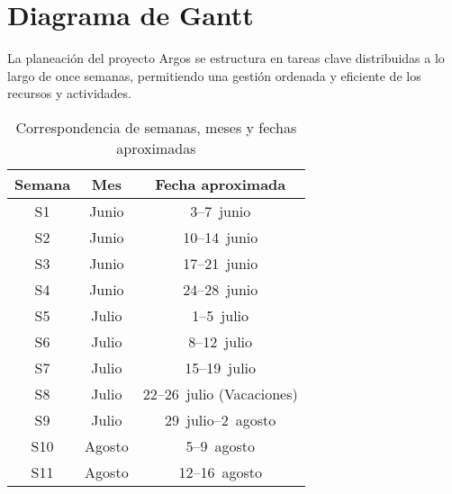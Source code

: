 \section{Diagrama de Gantt}

La planeación del proyecto Argos se estructura en tareas clave distribuidas a lo largo de once semanas, permitiendo una gestión ordenada y eficiente de los recursos y actividades.

\begin{table}[htbp]
  \centering
  \caption{Correspondencia de semanas, meses y fechas aproximadas}
  \begin{tabular}{ccc}
    \toprule
    \rowcolor{gray!30}
    \textbf{Semana} & \textbf{Mes} & \textbf{Fecha aproximada} \\
    \midrule
    S1  & Junio  & 3--7~junio \\
    S2  & Junio  & 10--14~junio \\
    S3  & Junio  & 17--21~junio \\
    S4  & Junio  & 24--28~junio \\
    S5  & Julio  & 1--5~julio \\
    S6  & Julio  & 8--12~julio \\
    S7  & Julio  & 15--19~julio \\
    S8  & Julio  & 22--26~julio (Vacaciones) \\
    S9  & Julio  & 29~julio--2~agosto \\
    S10 & Agosto & 5--9~agosto \\
    S11 & Agosto & 12--16~agosto \\
    \bottomrule
  \end{tabular}
  \label{tab:semanas_meses_fechas}
\end{table}


